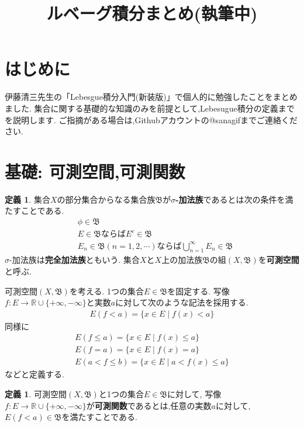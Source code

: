 \documentclass[a4paper,dvipdfmx]{jsarticle}
\title{ルベーグ積分まとめ(執筆中)}
\theoremstyle{definition}
\newtheorem{definition}[theorem]{定義}
\newcommand{\Bee}{\mathfrak{B}}
\newcommand{\R}{\mathbb{R}}
\begin{document}
\maketitle

\section*{はじめに}
伊藤清三先生の「Lebesgue積分入門(新装版)」で個人的に勉強したことをまとめました.
集合に関する基礎的な知識のみを前提として,Lebesugue積分の定義までを説明します.
ご指摘がある場合は,Githubアカウントの@sanagifまでご連絡ください.

\section{基礎: 可測空間,可測関数}
\begin{tcolorbox}
\begin{definition}
    集合$X$の部分集合からなる集合族$\Bee$が\textbf{$\sigma$-加法族}であるとは次の条件を満たすことである.
\begin{align}
    &\phi \in \Bee \\
    &E \in \Bee ならば E^c \in \Bee \\
    &E_n \in \Bee (n = 1, 2, \cdots) ならば \bigcup_{n=1}^{\infty} E_n \in \Bee
\end{align}
$\sigma$-加法族は\textbf{完全加法族}ともいう.
集合$X$と$X$上の加法族$\Bee$の組$(X,\Bee)$を\textbf{可測空間}と呼ぶ.
\end{definition}
\end{tcolorbox}

\par

可測空間$(X,\Bee)$を考える.
1つの集合$E \in \Bee$を固定する.
写像$f: E \to \R \cup \{+\infty, -\infty\}$と実数$a$に対して次のような記法を採用する.
\begin{align}
    E(f < a) = \{ x \in E \mid f(x) < a\}
\end{align}
同様に
\begin{align}
    E(f \le a) = \{ x \in E \mid f(x) \le a\} \\
    E(f = a) = \{ x \in E \mid f(x) = a\} \\
    E(a < f \le b) = \{ x \in E \mid a < f(x) \le a\}
\end{align}
などと定義する.

\begin{tcolorbox}
\begin{definition}
    可測空間$(X,\Bee)$と1つの集合$E \in \Bee$に対して,
    写像$f: E \to \R \cup \{+\infty, -\infty\}$が\textbf{可測関数}であるとは,任意の実数$a$に対して,
    $E(f < a) \in \Bee$を満たすことである.
\end{definition}
\end{tcolorbox}
\end{document}
